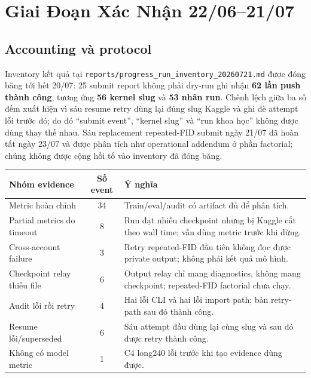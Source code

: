 \documentclass[11pt,a4paper]{article}
\newcommand{\run}[1]{{\small\nolinkurl{#1}}}
\begin{document}
\section{Giai Đoạn Xác Nhận 22/06--21/07}

\subsection{Accounting và protocol}

Inventory kết quả tại \run{reports/progress_run_inventory_20260721.md} được đóng băng tới hết 20/07: 25 submit report không phải dry-run ghi nhận \textbf{62 lần push thành công}, tương ứng \textbf{56 kernel slug} và \textbf{53 nhãn run}. Chênh lệch giữa ba số đếm xuất hiện vì sáu resume retry dùng lại đúng slug Kaggle và ghi đè attempt lỗi trước đó; do đó ``submit event'', ``kernel slug'' và ``run khoa học'' không được dùng thay thế nhau. Sáu replacement repeated-FID submit ngày 21/07 đã hoàn tất ngày 23/07 và được phân tích như operational addendum ở phần factorial; chúng không được cộng hồi tố vào inventory đã đóng băng.

\begin{center}
\small
\setlength{\tabcolsep}{4pt}
\begin{tabularx}{\linewidth}{@{}Y c Y@{}}
\toprule
\textbf{Nhóm evidence} & \textbf{Số event} & \textbf{Ý nghĩa}\\
\midrule
Metric hoàn chỉnh & 34 & Train/eval/audit có artifact đủ để phân tích.\\
Partial metrics do timeout & 8 & Run đạt nhiều checkpoint nhưng bị Kaggle cắt theo wall time; vẫn dùng metric trước khi dừng.\\
Cross-account failure & 3 & Retry repeated-FID đầu tiên không đọc được private output; không phải kết quả mô hình.\\
Checkpoint relay thiếu file & 6 & Output relay chỉ mang diagnostics, không mang checkpoint; repeated-FID factorial chưa chạy.\\
Audit lỗi rồi retry & 4 & Hai lỗi CLI và hai lỗi import path; bản retry-path sau đó thành công.\\
Resume lỗi/superseded & 6 & Sáu attempt đầu dùng lại cùng slug và sau đó được retry thành công.\\
Không có model metric & 1 & C4 long240 lỗi trước khi tạo evidence dùng được.\\
\bottomrule
\end{tabularx}
\end{center}
\end{document}
